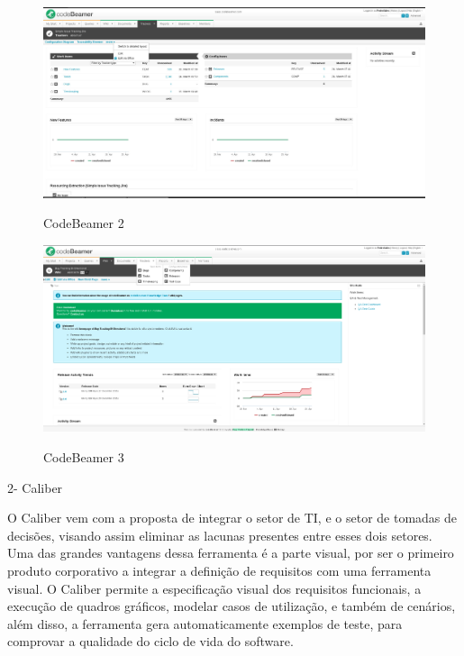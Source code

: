 \FloatBarrier
\begin{figure}[!htpd]
		\centering
		\caption{CodeBeamer 2}
		\includegraphics[scale=0.27]{figuras/Code01}
		\label{img:SAF}
\end{figure}
\FloatBarrier


\FloatBarrier
\begin{figure}[!htpd]
		\centering
		\caption{CodeBeamer 3}
		\includegraphics[scale=0.2]{figuras/Code02}
		\label{img:SAF}
\end{figure}
\FloatBarrier

2- Caliber

O Caliber vem com a proposta de integrar o setor de TI, e o setor de tomadas de decisões, visando assim eliminar as lacunas presentes entre esses dois setores. Uma das grandes vantagens dessa ferramenta é a parte visual, por ser o primeiro produto corporativo a integrar a definição de requisitos com uma ferramenta visual. O Caliber permite a especificação visual dos requisitos funcionais, a execução de quadros gráficos, modelar casos de utilização, e também de cenários, além disso, a ferramenta gera automaticamente exemplos de teste, para comprovar a qualidade do ciclo de vida do software.


